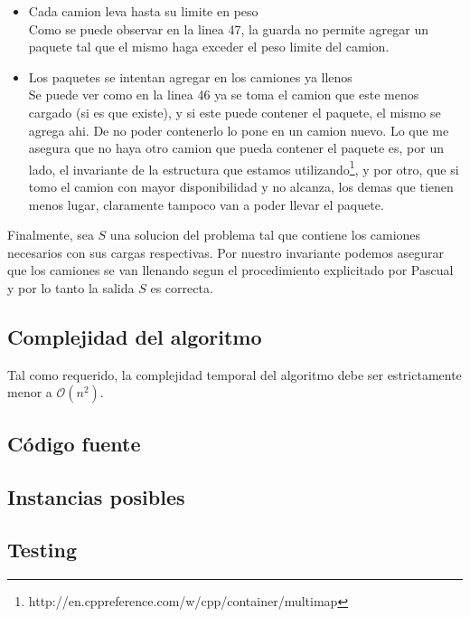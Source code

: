 \begin{itemize}
\item Cada camion leva hasta su limite en peso \\
Como se puede observar en la linea 47, la guarda no permite agregar un paquete tal que el mismo haga exceder el peso limite del camion.
\item Los paquetes se intentan agregar en los camiones ya llenos \\
 Se puede ver como en la linea 46 ya se toma el camion que este menos cargado (si es que existe), y si este puede contener el paquete, el mismo se agrega ahi. De no poder contenerlo lo pone en un camion nuevo. Lo que me asegura que no haya otro camion que pueda contener el paquete es, por un lado, el invariante de la estructura que estamos utilizando\footnote{http://en.cppreference.com/w/cpp/container/multimap}, y por otro, que si tomo el camion con mayor disponibilidad y no alcanza, los demas que tienen menos lugar, claramente tampoco van a poder llevar el paquete. 
\end{itemize}

Finalmente, sea $S$ una solucion del problema tal que contiene los camiones necesarios con sus cargas respectivas. Por nuestro invariante podemos asegurar que los camiones se van llenando segun el procedimiento explicitado por Pascual y por lo tanto la salida $S$ es correcta.


\subsection{Complejidad del algoritmo}
Tal como requerido, la complejidad temporal del algoritmo debe ser estrictamente menor a $\mathcal{O}(n^2)$.


\subsection{Código fuente}



\subsection{Instancias posibles}



\subsection{Testing}
